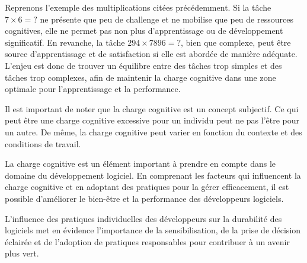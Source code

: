Reprenons l'exemple des multiplications citées précédemment. Si la tâche $7 \times 6 = ?$ ne présente que peu de challenge et ne mobilise que peu de ressources cognitives, elle ne permet pas non plus d'apprentissage ou de développement significatif. En revanche, la tâche $294 \times 7 896 = ?$, bien que complexe, peut être source d'apprentissage et de satisfaction si elle est abordée de manière adéquate. L'enjeu est donc de trouver un équilibre entre des tâches trop simples et des tâches trop complexes, afin de maintenir la charge cognitive dans une zone optimale pour l'apprentissage et la performance.


Il est important de noter que la charge cognitive est un concept subjectif. Ce qui peut être une charge cognitive excessive pour un individu peut ne pas l'être pour un autre. De même, la charge cognitive peut varier en fonction du contexte et des conditions de travail.


La charge cognitive est un élément important à prendre en compte dans le domaine du développement logiciel. En comprenant les facteurs qui influencent la charge cognitive et en adoptant des pratiques pour la gérer efficacement, il est possible d'améliorer le bien-être et la performance des développeurs logiciels.



L'influence des pratiques individuelles des développeurs sur la durabilité des logiciels met en évidence l'importance de la sensibilisation, de la prise de décision éclairée et de l'adoption de pratiques responsables pour contribuer à un avenir plus vert.

